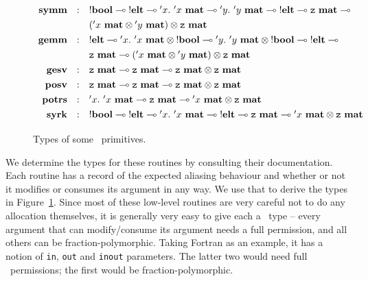 \begin{figure}
    \begin{center}
    \[\def\arraystretch{1.3}
    \begin{array}{rcl}
%
        \ottkw{symm} &:& {!\Bool} \multimap {!\Elt} \multimap {'x}.\
            {{'x}\ \Mat} \multimap {'y}.\ {{'y}\ \Mat} \multimap {!\Elt}
            \multimap {\Zf\ \Mat} \multimap
            \\ && ( {{'x}\ \Mat} \otimes {{'y}\ \Mat} ) \otimes {\Zf\ \Mat} \\
%
        \ottkw{gemm} &:& {!\Elt} \multimap {'x}.\ {{'x}\ \Mat} \otimes
            {!\Bool} \multimap {'y}.\ {{'y}\ \Mat} \otimes {!\Bool}
            \multimap {!\Elt} \multimap
            \\ && {\Zf\ \Mat} \multimap ( {{'x}\ \Mat} \otimes {{'y}\ \Mat} )
            \otimes {\Zf\ \Mat} \\
%
        \ottkw{gesv} &:& {\Zf\ \Mat} \multimap {\Zf\ \Mat} \multimap
            {\Zf\ \Mat} \otimes {\Zf\ \Mat} \\
%
        \ottkw{posv} &:& {\Zf\ \Mat} \multimap {\Zf\ \Mat} \multimap
            {\Zf\ \Mat} \otimes {\Zf\ \Mat} \\
%
        \ottkw{potrs} &:& {'x}.\ {{'x}\ \Mat} \multimap {\Zf\ \Mat}
            \multimap {{'x}\ \Mat} \otimes {\Zf\ \Mat} \\
%
        \ottkw{syrk} &:& {!\Bool} \multimap {!\Elt} \multimap {'x}.\
            {{'x}\ \Mat} \multimap {!\Elt} \multimap {\Zf\ \Mat} \multimap
            {{'x}\ \Mat} \otimes {\Zf\ \Mat} \\
%
    \end{array} \]
    \end{center}
    \caption{Types of some \lang\ primitives.}\label{fig:primitive_types}
\end{figure}

We determine the types for these routines by consulting their documentation.
Each routine has a record of the expected aliasing behaviour and whether or not
it modifies or consumes its argument in any way. We use that to derive the
types in Figure~\ref{fig:primitive_types}. Since most of these low-level
routines are very careful not to do any allocation themselves, it is generally
very easy to give each a \lang\ type -- every argument that can modify/consume
its argument needs a full permission, and all others can be
fraction-polymorphic.  Taking Fortran as an example, it has a notion of
\texttt{in}, \texttt{out} and \texttt{inout} parameters. The latter two would
need full \Zf\ permissions; the first would be fraction-polymorphic.

